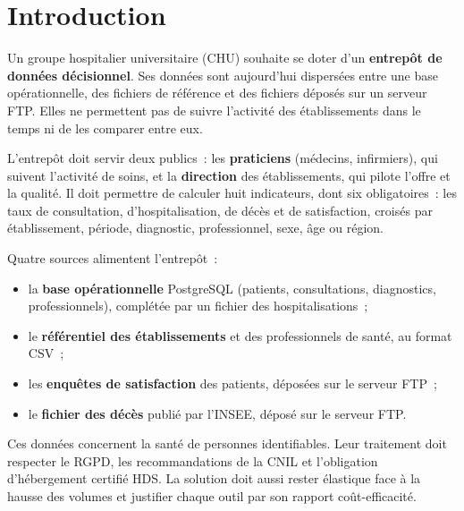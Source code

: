 \newpage
\section*{Introduction}
{}

\noindent Un groupe hospitalier universitaire (CHU) souhaite se doter d'un \textbf{entrepôt de données décisionnel}. Ses données sont aujourd'hui dispersées entre une base opérationnelle, des fichiers de référence et des fichiers déposés sur un serveur FTP. Elles ne permettent pas de suivre l'activité des établissements dans le temps ni de les comparer entre eux.

\vspace{0.2cm}

\noindent L'entrepôt doit servir deux publics~: les \textbf{praticiens} (médecins, infirmiers), qui suivent l'activité de soins, et la \textbf{direction} des établissements, qui pilote l'offre et la qualité. Il doit permettre de calculer huit indicateurs, dont six obligatoires~: les taux de consultation, d'hospitalisation, de décès et de satisfaction, croisés par établissement, période, diagnostic, professionnel, sexe, âge ou région.

\vspace{0.2cm}

\noindent Quatre sources alimentent l'entrepôt~:
\begin{itemize}
	\item la \textbf{base opérationnelle} PostgreSQL (patients, consultations, diagnostics, professionnels), complétée par un fichier des hospitalisations~;
	\item le \textbf{référentiel des établissements} et des professionnels de santé, au format CSV~;
	\item les \textbf{enquêtes de satisfaction} des patients, déposées sur le serveur FTP~;
	\item le \textbf{fichier des décès} publié par l'INSEE, déposé sur le serveur FTP.
\end{itemize}

\noindent Ces données concernent la santé de personnes identifiables. Leur traitement doit respecter le RGPD, les recommandations de la CNIL et l'obligation d'hébergement certifié HDS. La solution doit aussi rester élastique face à la hausse des volumes et justifier chaque outil par son rapport coût-efficacité.

\vspace{0.2cm}

